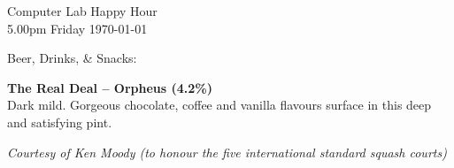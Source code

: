\documentclass[a4paper,landscape]{article}
\begin{document}
\thispagestyle{empty}

\begin{center}

    {\Large Computer Lab Happy Hour} \\ \smallskip
    {\large 5.00pm Friday \today}

    \vfill

    {\Huge Beer, Drinks, \& Snacks:} \\ \bigskip \bigskip

    \vfill

    \textbf{\Large The Real Deal -- Orpheus (4.2\%)} \\ \smallskip
    Dark mild. Gorgeous chocolate, coffee and vanilla flavours surface in this deep and satisfying pint.

    \vfill

    \textit{\Large Courtesy of Ken Moody (to honour the five international standard squash courts)}

\end{center}

\medskip
\end{document}
